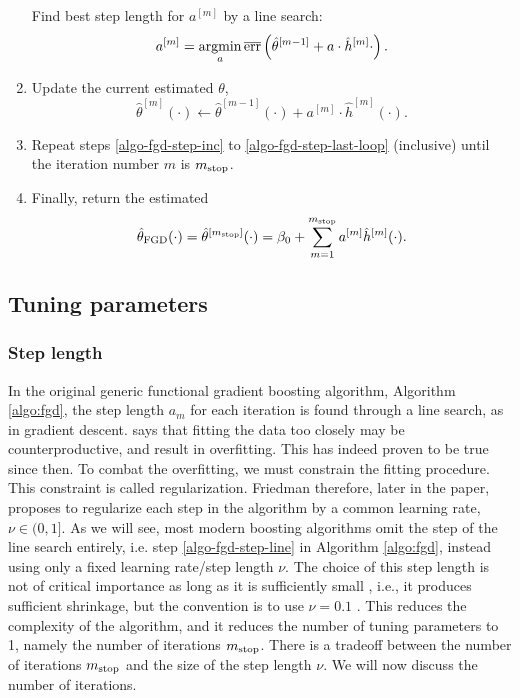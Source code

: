 \begin{algorithm}
\begin{enumerate}
        \label{algo-fgd-step-line}
        Find best step length for $a^{[m]}$ by a line search:
        \begin{equation*}
            a^{[m]}=\operatorname*{argmin}_{a}\overline{\text{err}}\left(\hat{\theta}^{[m-1]}+a\cdot\hat{h}^{[m]}{\cdot}\right).
        \end{equation*}
    \item
        \label{algo-fgd-step-last-loop}
        Update the current estimated $\theta$,
        \begin{equation*}
            \hat{\theta}^{[m]}(\cdot)\gets \hat{\theta}^{[m-1]}(\cdot)+a^{[m]}\cdot \hat{h}^{[m]}(\cdot).
        \end{equation*}
    \item
        Repeat steps \ref{algo-fgd-step-inc} to \ref{algo-fgd-step-last-loop} (inclusive) until the iteration number $m$ is $m_{\text{stop}}$.
    \item
        Finally, return the estimated
        \begin{equation*}
            \hat{\theta}_{\text{FGD}}(\cdot)=\hat{\theta}^{[m_{\text{stop}}]}(\cdot)=\beta_0+\sum_{m=1}^{m_{\text{stop}}}a^{[m]}\hat{h}^{[m]}(\cdot).
        \end{equation*}
\end{enumerate}
\end{algorithm}

\subsection{Tuning parameters}
\subsubsection{Step length}
In the original generic functional gradient boosting algorithm, Algorithm \ref{algo:fgd}, the step length $a_m$ for each iteration is found through a line search, as in gradient descent.
\citet{friedman2001} says that fitting the data too closely may be counterproductive, and result in overfitting.
This has indeed proven to be true since then.
To combat the overfitting, we must constrain the fitting procedure.
This constraint is called regularization.
Friedman therefore, later in the paper, proposes to regularize each step in the algorithm by a common learning rate, $\nu\in(0,1]$.
As we will see, most modern boosting algorithms omit the step of the line search entirely, i.e. step \ref{algo-fgd-step-line} in Algorithm \ref{algo:fgd}, instead using only a fixed learning rate/step length $\nu$. 
The choice of this step length is not of critical importance as long as it is sufficiently small \citep{schmid-hothorn}, i.e., it produces sufficient shrinkage, but the convention is to use $\nu=0.1$ \citep{mayr14a}.
This reduces the complexity of the algorithm, and it reduces the number of tuning parameters to 1, namely the number of iterations $m_{\text{stop}}$.
There is a tradeoff between the number of iterations $m_{\text{stop}}$ and the size of the step length $\nu$.
We will now discuss the number of iterations.

